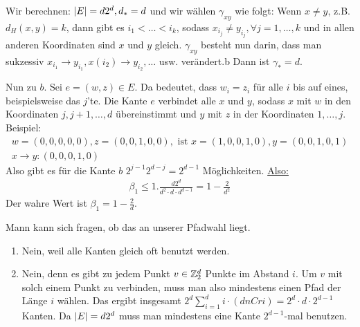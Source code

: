 \begin{beispiel}
	 Wir berechnen: $\lvert E\rvert = d 2^d, d_* = d$ und wir wählen $\gamma_{xy}$ wie folgt: Wenn $x \neq y$, z.B. $d_H(x,y) = k$, dann gibt es $i_1 < \dots < i_k$, sodass $x_{i_j} \neq y_{i_j}, \forall j = 1, \dots, k$ und in allen anderen Koordinaten sind $x$ und $y$ gleich. $\gamma_{xy}$ besteht nun darin, dass man sukzessiv $x_{i_1} \to y_{i_1}, x(i_2) \to y_{i_2}, \dots$ usw. verändert.b Dann ist $\gamma_* = d$.

	Nun zu $b$. Sei $e = (w,z) \in E$. Da bedeutet, dass $w_i = z_i$ für alle $i$ bis auf eines, beispielsweise das $j$'te. Die Kante $e$ verbindet alle $x$ und $y$, sodass $x$ mit $w$ in den Koordinaten $j,j+1,\dots,d$ übereinstimmt und $y$ mit $z$ in der Koordinaten $1, \dots, j$. Beispiel:
	\begin{gather}
		w = (0,0,0,0,0), z = (0,0,1,0,0), \text{ ist } x = (1,0,0,1,0), y = (0,0,1,0,1) \\
		x\to y: (0,0,0,1,0)
	\end{gather}
	Also gibt es für die Kante $b$ $2^{j-1} 2^{d-j} = 2^{d-1}$ Möglichkeiten. \underline{Also:}
	\begin{align}
		\beta_1 \leq 1 . \frac{d2^{d}}{d^2 \cdot d \cdot d^{d-1}} = 1 - \frac{2}{d^2}
	\end{align}
	Der wahre Wert ist $\beta_1 = 1 - \frac{2}{d}$. 
	\begin{bemerkung}
		Mann kann sich fragen, ob das an unserer Pfadwahl liegt.
		\begin{enumerate}
			\item Nein, weil alle Kanten gleich oft benutzt werden. 
			\item Nein, denn es gibt zu jedem Punkt $v \in \mathbb{Z}^d_2$ Punkte im Abstand $i$. Um $v$ mit solch einem Punkt zu verbinden, muss man also mindestens einen Pfad der Länge $i$ wählen. Das ergibt insgesamt $2^d \sum_{i = 1}^{d} i \cdot (d nCr i) = 2^d \cdot d \cdot 2^{d-1}$ Kanten. Da $\lvert E\rvert = d 2^d$ muss man mindestens eine Kante $2^{d-1}$-mal benutzen.
		\end{enumerate}
	\end{bemerkung}
\end{beispiel}

